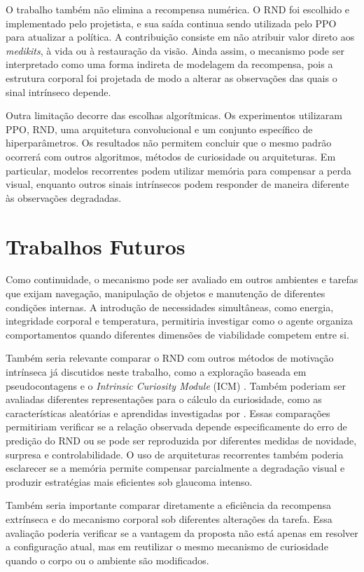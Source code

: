 O trabalho também não elimina a recompensa numérica. O RND foi escolhido e implementado pelo projetista, e sua saída continua sendo utilizada pelo PPO para atualizar a política. A contribuição consiste em não atribuir valor direto aos \textit{medikits}, à vida ou à restauração da visão. Ainda assim, o mecanismo pode ser interpretado como uma forma indireta de modelagem da recompensa, pois a estrutura corporal foi projetada de modo a alterar as observações das quais o sinal intrínseco depende.

Outra limitação decorre das escolhas algorítmicas. Os experimentos utilizaram PPO, RND, uma arquitetura convolucional e um conjunto específico de hiperparâmetros. Os resultados não permitem concluir que o mesmo padrão ocorrerá com outros algoritmos, métodos de curiosidade ou arquiteturas. Em particular, modelos recorrentes podem utilizar memória para compensar a perda visual, enquanto outros sinais intrínsecos podem responder de maneira diferente às observações degradadas.

\section{Trabalhos Futuros}
\label{sec:trabalhos-futuros}

Como continuidade, o mecanismo pode ser avaliado em outros ambientes e tarefas que exijam navegação, manipulação de objetos e manutenção de diferentes condições internas. A introdução de necessidades simultâneas, como energia, integridade corporal e temperatura, permitiria investigar como o agente organiza comportamentos quando diferentes dimensões de viabilidade competem entre si.

Também seria relevante comparar o RND com outros métodos de motivação intrínseca já discutidos neste trabalho, como a exploração baseada em pseudocontagens \cite{bellemare2016count} e o \textit{Intrinsic Curiosity Module} (ICM) \cite{icm}. Também poderiam ser avaliadas diferentes representações para o cálculo da curiosidade, como as características aleatórias e aprendidas investigadas por . Essas comparações permitiriam verificar se a relação observada depende especificamente do erro de predição do RND ou se pode ser reproduzida por diferentes medidas de novidade, surpresa e controlabilidade. O uso de arquiteturas recorrentes também poderia esclarecer se a memória permite compensar parcialmente a degradação visual e produzir estratégias mais eficientes sob glaucoma intenso.

Também seria importante comparar diretamente a eficiência da recompensa extrínseca e do mecanismo corporal sob diferentes alterações da tarefa. Essa avaliação poderia verificar se a vantagem da proposta não está apenas em resolver a configuração atual, mas em reutilizar o mesmo mecanismo de curiosidade quando o corpo ou o ambiente são modificados.